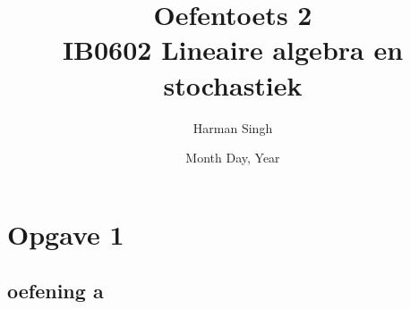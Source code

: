\documentclass[11pt, a4paper]{article}
\title{Oefentoets 2 \\ IB0602 Lineaire algebra en stochastiek}
\author{Harman Singh}
\date{Month Day, Year}
\begin{document}
\maketitle

\pagebreak
\section*{Opgave 1}
\subsection*{oefening a}
\end{document}
